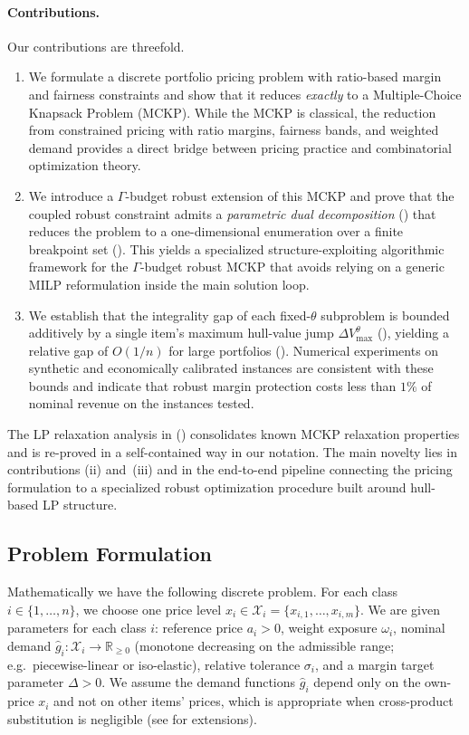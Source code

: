 \documentclass[11pt, a4paper]{article}
\theoremstyle{plain}
\theoremstyle{definition}
\theoremstyle{remark}
\newcommand{\R}{\mathbb{R}}
\begin{document}
\paragraph{Contributions.}
Our contributions are threefold.
\begin{enumerate}
\item[(i)] We formulate a discrete portfolio pricing problem with ratio-based margin and fairness constraints and show that it reduces \emph{exactly} to a Multiple-Choice Knapsack Problem (MCKP). While the MCKP is classical, the reduction from constrained pricing with ratio margins, fairness bands, and weighted demand provides a direct bridge between pricing practice and combinatorial optimization theory.

\item[(ii)] We introduce a $\Gamma$-budget robust extension of this MCKP and prove that the coupled robust constraint admits a \emph{parametric dual decomposition} () that reduces the problem to a one-dimensional enumeration over a finite breakpoint set (). This yields a specialized structure-exploiting algorithmic framework for the $\Gamma$-budget robust MCKP that avoids relying on a generic MILP reformulation inside the main solution loop.

\item[(iii)] We establish that the integrality gap of each fixed-$\theta$ subproblem is bounded additively by a single item's maximum hull-value jump $\Delta V^{\theta}_{\max}$ (), yielding a relative gap of \(O(1/n)\) for large portfolios (). Numerical experiments on synthetic and economically calibrated instances are consistent with these bounds and indicate that robust margin protection costs less than $1\%$ of nominal revenue on the instances tested.
\end{enumerate}
The LP relaxation analysis in  () consolidates known MCKP relaxation properties \citep{Dyer1984,Pisinger1995} and is re-proved in a self-contained way in our notation. The main novelty lies in contributions (ii) and~(iii) and in the end-to-end pipeline connecting the pricing formulation to a specialized robust optimization procedure built around hull-based LP structure.

\subsection{Problem Formulation}
\noindent Mathematically we have the following discrete problem. For each class $i\in\{1,\dots,n\}$, we choose one price level $x_i \in \mathcal X_i=\{x_{i,1},\dots,x_{i,m}\}.$ We are given parameters for each class $i$: reference price $a_i>0$, weight exposure $\omega_i$, nominal demand $\hat{g}_i:\mathcal{X}_i\to \R_{\geq0}$ (monotone decreasing on the admissible range; e.g.\ piecewise-linear or iso-elastic), relative tolerance $\sigma_i$, and a margin target parameter $\Delta>0$.
We assume the demand functions $\hat{g}_i$ depend only on the own-price $x_i$ and not on other items' prices, which is appropriate when cross-product substitution is negligible (see  for extensions).
\end{document}
